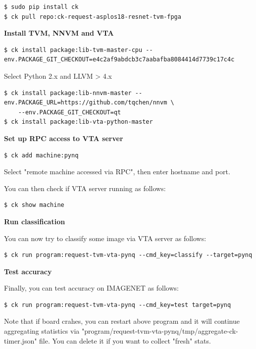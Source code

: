 \documentclass[sigconf]{acmart}
\begin{document}
\begin{verbatim}
$ sudo pip install ck
$ ck pull repo:ck-request-asplos18-resnet-tvm-fpga
\end{verbatim}

\textbf{Install TVM, NNVM and VTA}

\begin{verbatim}
$ ck install package:lib-tvm-master-cpu --env.PACKAGE_GIT_CHECKOUT=e4c2af9abdcb3c7aabafba8084414d7739c17c4c
\end{verbatim}

Select Python 2.x and LLVM > 4.x

\begin{verbatim}
$ ck install package:lib-nnvm-master --env.PACKAGE_URL=https://github.com/tqchen/nnvm \
    --env.PACKAGE_GIT_CHECKOUT=qt
$ ck install package:lib-vta-python-master
\end{verbatim}

\textbf{Set up RPC access to VTA server}

\begin{verbatim}
$ ck add machine:pynq
\end{verbatim}

Select "remote machine accessed via RPC", then enter hostname and port.

You can then check if VTA server running as follows:

\begin{verbatim}
$ ck show machine
\end{verbatim}

\textbf{Run classification}

You can now try to classify some image via VTA server as follows:

\begin{verbatim}
$ ck run program:request-tvm-vta-pynq --cmd_key=classify --target=pynq
\end{verbatim}

\textbf{Test accuracy}

Finally, you can test accuracy on IMAGENET as follows:

\begin{verbatim}
$ ck run program:request-tvm-vta-pynq --cmd_key=test target=pynq
\end{verbatim}

Note that if board crahes, you can restart above program and it will continue aggregating statistics
via "program/request-tvm-vta-pynq/tmp/aggregate-ck-timer.json" file. 
You can delete it if you want to collect "fresh" stats.
\end{document}
